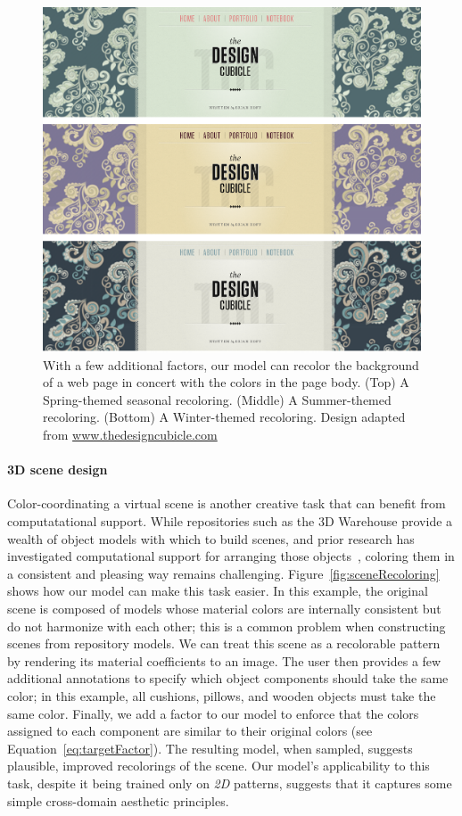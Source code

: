 \begin{figure}[ht]
\centering
\includegraphics[width=\columnwidth]{figs/webpageRecoloring}
\caption{With a few additional factors, our model can recolor the background of a web page in concert with the colors in the page body. (Top) A Spring-themed seasonal recoloring. (Middle) A Summer-themed recoloring. (Bottom) A Winter-themed recoloring. Design adapted from \url{www.thedesigncubicle.com}}
\label{fig:webpageRecoloring}
\end{figure}

\paragraph{3D scene design}
Color-coordinating a virtual scene is another creative task that can benefit from computatational support. While repositories such as the 3D Warehouse provide a wealth of object models with which to build scenes, and prior research has investigated computational support for arranging those objects~\cite{SceneSynth}, coloring them in a consistent and pleasing way remains challenging. Figure~\ref{fig:sceneRecoloring} shows how our model can make this task easier. In this example, the original scene is composed of models whose material colors are internally consistent but do not harmonize with each other; this is a common problem when constructing scenes from repository models. We can treat this scene as a recolorable pattern by rendering its material coefficients to an image. The user then provides a few additional annotations to specify which object components should take the same color; in this example, all cushions, pillows, and wooden objects must take the same color. Finally, we add a factor to our model to enforce that the colors assigned to each component are similar to their original colors (see Equation~\ref{eq:targetFactor}). The resulting model, when sampled, suggests plausible, improved recolorings of the scene. Our model's applicability to this task, despite it being trained only on \emph{2D} patterns, suggests that it captures some simple cross-domain aesthetic principles.

